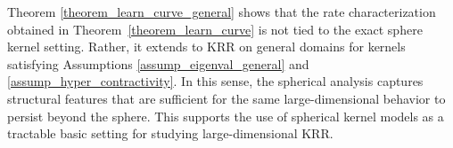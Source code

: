 \documentclass{article}
\theoremstyle{plain}
\theoremstyle{definition}
\theoremstyle{remark}
\newcommand{\dhnote}[1]{{\color{red}[#1]} } %
\newcommand{\dhrev}[2]{{\color{cyan}[Old:]\textit{#1}} {\color{magenta}[New]#2}} %
\begin{document}


Theorem \ref{theorem_learn_curve_general} shows that the rate characterization obtained in Theorem~\ref{theorem_learn_curve} is not tied to the exact sphere kernel setting. 
Rather, it extends to KRR on general domains for kernels satisfying Assumptions \ref{assump_eigenval_general} and \ref{assump_hyper_contractivity}.
In this sense, the spherical analysis captures structural features that are sufficient for the same large-dimensional behavior to persist beyond the sphere.
This supports the use of spherical kernel models as a tractable basic setting for studying large-dimensional KRR. 
\end{document}
